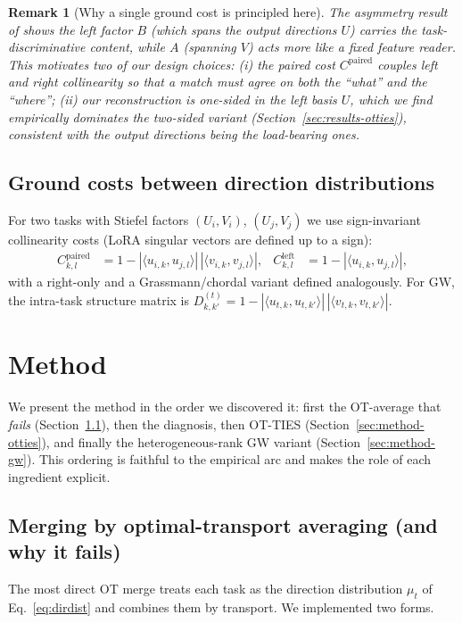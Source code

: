 \documentclass[11pt]{article}
\newtheorem{remark}{Remark}
\newcommand{\otties}{\textsc{OT-TIES}}
\begin{document}
\begin{remark}[Why a single ground cost is principled here]
The asymmetry result of \citet{zhu2024asymmetry} shows the left factor $B$ (which spans the output
directions $U$) carries the task-discriminative content, while $A$ (spanning $V$) acts more like a fixed
feature reader. This motivates two of our design choices: (i) the \emph{paired} cost
$C^{\text{paired}}$ couples left \emph{and} right collinearity so that a match must agree on both the
``what'' and the ``where''; (ii) our reconstruction is \emph{one-sided} in the left basis $U$, which we
find empirically dominates the two-sided variant (Section~\ref{sec:results-otties}), consistent with
the output directions being the load-bearing ones.
\end{remark}

\subsection{Ground costs between direction distributions}
For two tasks with Stiefel factors $(U_i,V_i)$, $(U_j,V_j)$ we use sign-invariant collinearity costs
(LoRA singular vectors are defined up to a sign):
\begin{align}
C^{\text{paired}}_{k,l} &= 1 - |\langle u_{i,k},u_{j,l}\rangle|\,|\langle v_{i,k},v_{j,l}\rangle|,
&
C^{\text{left}}_{k,l} &= 1 - |\langle u_{i,k},u_{j,l}\rangle|,
\label{eq:costs}
\end{align}
with a right-only and a Grassmann/chordal variant defined analogously. For GW, the intra-task structure
matrix is $D^{(t)}_{k,k'} = 1 - |\langle u_{t,k},u_{t,k'}\rangle|\,|\langle v_{t,k},v_{t,k'}\rangle|$.

\section{Method}
\label{sec:method}

We present the method in the order we discovered it: first the OT-average that \emph{fails}
(Section~\ref{sec:method-averaging}), then the diagnosis, then \otties{}
(Section~\ref{sec:method-otties}), and finally the heterogeneous-rank GW variant
(Section~\ref{sec:method-gw}). This ordering is faithful to the empirical arc and makes the role of each
ingredient explicit.

\subsection{Merging by optimal-transport averaging (and why it fails)}
\label{sec:method-averaging}
The most direct OT merge treats each task as the direction distribution $\mu_t$ of
Eq.~\eqref{eq:dirdist} and combines them by transport. We implemented two forms.
\end{document}
